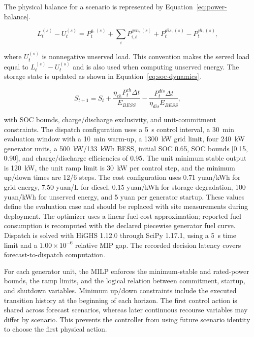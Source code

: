 The physical balance for a scenario is represented by
Equation~\eqref{eq:power-balance}.

\begin{equation}
\label{eq:power-balance}
L^{(s)}_t-U^{(s)}_t=P^{g,(s)}_t+\sum_i P^{gen,(s)}_{i,t}+P^{dis,(s)}_t-P^{ch,(s)}_t,
\end{equation}

where $U^{(s)}_t$ is nonnegative unserved load. This convention makes
the served load equal to $L^{(s)}_t-U^{(s)}_t$ and is also used when
computing unserved energy. The storage state is updated as shown in
Equation~\eqref{eq:soc-dynamics}.

\begin{equation}
\label{eq:soc-dynamics}
S_{t+1}=S_t+\frac{\eta_{ch}P^{ch}_t\Delta t}{E_{BESS}}
-\frac{P^{dis}_t\Delta t}{\eta_{dis}E_{BESS}},
\end{equation}

with SOC bounds, charge/discharge exclusivity, and unit-commitment
constraints. The dispatch configuration uses a 5~s control interval,
a 30~min evaluation window with a 10~min warm-up, a 1300~kW grid limit,
four 240~kW generator units, a 500~kW/133~kWh BESS, initial SOC 0.65, SOC
bounds [0.15, 0.90], and charge/discharge efficiencies of 0.95. The unit
minimum stable output is 120~kW, the unit ramp limit is 30~kW per control
step, and the minimum up/down times are 12/6 steps. The cost configuration
uses 0.71 yuan/kWh for grid energy, 7.50 yuan/L for
diesel, 0.15 yuan/kWh for storage degradation, 100 yuan/kWh for unserved
energy, and 5 yuan per generator startup. These values define the evaluation
case and should be replaced with site measurements during deployment. The
optimizer uses a linear fuel-cost approximation; reported fuel consumption
is recomputed with the declared piecewise generator fuel curve. Dispatch is
solved with HiGHS 1.12.0 through SciPy 1.17.1, using a 5~s time limit and a
$1.00\times10^{-6}$ relative MIP gap. The recorded decision latency covers
forecast-to-dispatch computation.

For each generator unit, the MILP enforces the minimum-stable and rated-power
bounds, the ramp limits, and the logical relation between commitment,
startup, and shutdown variables. Minimum up/down constraints include the
executed transition history at the beginning of each horizon. The first
control action is shared across forecast scenarios, whereas later
continuous recourse variables may differ by scenario. This prevents the
controller from using future scenario identity to choose the first physical
action.

